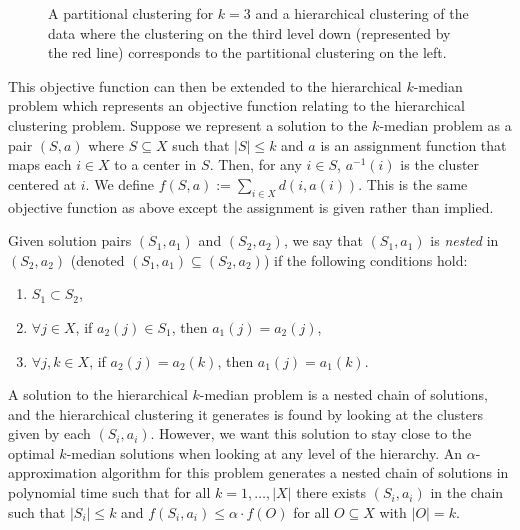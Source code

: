 \documentclass[conference, 10pt, final]{IEEEtran}
\begin{document}
\begin{figure}[!t]
\centerline{
\hfil
{}}
\caption{A partitional clustering for $k=3$ and a hierarchical clustering of the data where the clustering on the third level down (represented by the red line) corresponds to the partitional clustering on the left.}
\label{fig_hier}
\end{figure}

This objective function can then be extended to the hierarchical $k$-median problem which represents an objective function relating to the hierarchical clustering problem. Suppose we represent a solution to the $k$-median problem as a pair $(S, a)$ where $S \subseteq X$ such that $|S| \leq k$ and $a$ is an assignment function that maps each $i \in X$ to a center in $S$. Then, for any $i \in S$, $a^{-1}(i)$ is the cluster centered at $i$. We define $f(S,a) := \sum_{i \in X} d(i, a(i))$. This is the same objective function as above except the assignment is given rather than implied.

Given solution pairs $(S_1, a_1)$ and $(S_2, a_2)$, we say that $(S_1, a_1)$ is \emph{nested} in $(S_2, a_2)$ (denoted $(S_1, a_1) \subseteq (S_2, a_2)$) if the following conditions hold:
\begin{enumerate}[\IEEEsetlabelwidth{3)}]
	\item $S_1 \subset S_2$, 
	\item $\forall  j \in X$, if $a_2(j) \in S_1$, then $a_1(j) = a_2(j)$, 
	\item $\forall j, k \in X$, if $a_2(j) = a_2(k)$, then $a_1(j) = a_1(k)$.
\end{enumerate}
A solution to the hierarchical $k$-median problem is a nested chain of solutions, and the hierarchical clustering it generates is found by looking at the clusters given by each $(S_i, a_i)$. However, we want this solution to stay close to the optimal $k$-median solutions when looking at any level of the hierarchy. An $\alpha$-approximation algorithm for this problem generates a nested chain of solutions in polynomial time such that for all $k = 1, \ldots, |X|$ there exists $(S_i, a_i)$ in the chain such that $|S_i| \leq k$ and $f(S_i, a_i) \leq \alpha \cdot f(O)$ for all $O \subseteq X$ with $|O| = k$.
\end{document}
